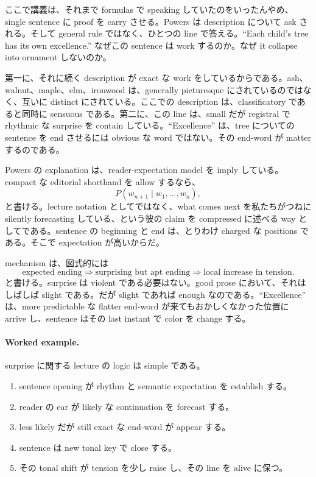 ここで講義は、それまで formulas で speaking していたのをいったんやめ、single sentence に proof を carry させる。Powers は description について ask される。そして general rule ではなく、ひとつの line で答える。``Each child's tree has its own excellence.'' なぜこの sentence は work するのか。なぜ it collapse into ornament しないのか。

第一に、それに続く description が exact な work をしているからである。ash、walnut、maple、elm、ironwood は、generally picturesque にされているのではなく、互いに distinct にされている。ここでの description は、classificatory であると同時に sensuous である。第二に、この line は、small だが registral で rhythmic な surprise を contain している。``Excellence'' は、tree についての sentence を end させるには obvious な word ではない。その end-word が matter するのである。

Powers の explanation は、reader-expectation model を imply している。compact な editorial shorthand を allow するなら、
\begin{equation}
P(w_{n+1}\mid w_1,\dots,w_n),
\end{equation}
と書ける。lecture notation としてではなく、what comes next を私たちがつねに silently forecasting している、という彼の claim を compressed に述べる way としてである。sentence の beginning と end は、とりわけ charged な positions である。そこで expectation が高いからだ。

mechanism は、図式的には
\begin{equation}
\text{expected ending} \Rightarrow \text{surprising but apt ending} \Rightarrow \text{local increase in tension}.
\end{equation}
と書ける。surprise は violent である必要はない。good prose において、それはしばしば slight である。だが slight であれば enough なのである。``Excellence'' は、more predictable な flatter end-word が来てもおかしくなかった位置に arrive し、sentence はその last instant で color を change する。

\paragraph{Worked example.} surprise に関する lecture の logic は simple である。
\begin{enumerate}
\item sentence opening が rhythm と semantic expectation を establish する。
\item reader の ear が likely な continuation を forecast する。
\item less likely だが still exact な end-word が appear する。
\item sentence は new tonal key で close する。
\item その tonal shift が tension を少し raise し、その line を alive に保つ。
\end{enumerate}

